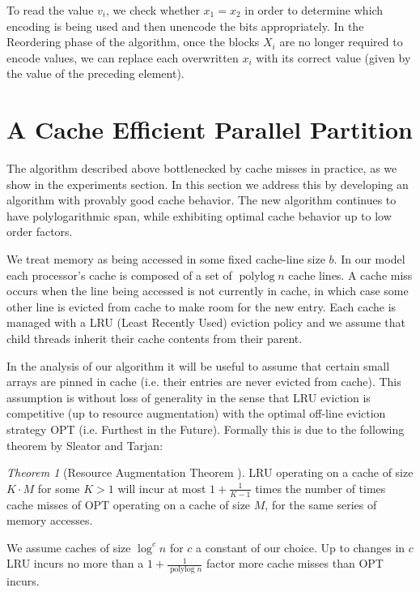 \documentclass[sigconf]{acmart}
\renewcommand{\paragraph}[1]{\vspace{0.09in}\noindent{\bf \boldmath #1.}}
\theoremstyle{remark}
\newtheorem{theorem}{Theorem}[section]
\theoremstyle{remark}
\begin{document}
To read the value $v_i$, we check whether $x_1 = x_2$ in order to
determine which encoding is being used and then unencode the bits
appropriately. In the Reordering phase of the algorithm, once the
blocks $X_i$ are no longer required to encode values, we can replace
each overwritten $x_i$ with its correct value (given by the value of
the preceding element).

\section{A Cache Efficient Parallel Partition}

The algorithm described above bottlenecked by cache misses in practice, as we show in the experiments section. 
In this section we address this by developing an algorithm with provably good cache behavior. 
The new algorithm continues to have polylogarithmic span, while exhibiting optimal cache behavior up to low order factors.

\paragraph{Modelling Cache Misses}
We treat memory as being accessed in some fixed cache-line size $b$. 
In our model each processor's cache is composed of a set of $\operatorname{polylog}{n}$ cache lines.
A cache miss occurs when the line being accessed is not currently in cache, in which case some other line is evicted from cache to make room for the new entry.
Each cache is managed with a LRU (Least Recently Used) eviction policy and we assume that child threads inherit their cache contents from their parent.

In the analysis of our algorithm it will be useful to assume that certain small arrays are pinned in cache (i.e. their entries are never evicted from cache).
This assumption is without loss of generality in the sense that LRU eviction is competitive (up to resource augmentation) with the optimal off-line eviction strategy OPT (i.e. Furthest in the Future).
Formally this is due to the following theorem by Sleator and Tarjan:
\begin{theorem}[Resource Augmentation Theorem \cite{SleatorTa85}]
	LRU operating on a cache of size $K\cdot M$ for some $K>1$ will incur at most $1+\frac{1}{K-1}$ times the number of times cache misses of OPT operating on a cache of size $M$, for the same series of memory accesses.
\end{theorem}

We assume caches of size $\log^c n$ for $c$ a constant of our choice. 
Up to changes in $c$ LRU incurs no more than a $1+\frac{1}{\operatorname{polylog}{n}}$ factor more cache misses than OPT incurs.
\end{document}
